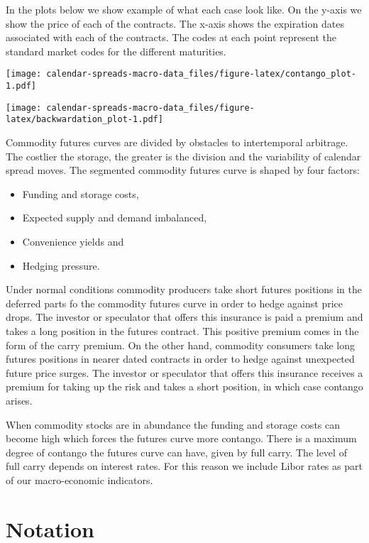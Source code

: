 \documentclass[
]{book}
\providecommand{\tightlist}{%
  \setlength{\itemsep}{0pt}\setlength{\parskip}{0pt}}
\begin{document}
In the plots below we show example of what each case look like. On the y-axis we show the price of each of the contracts. The x-axis shows the expiration dates associated with each of the contracts. The codes at each point represent the standard market codes for the different maturities.

\texttt{[image: calendar-spreads-macro-data\_files/figure-latex/contango\_plot-1.pdf]}

\texttt{[image: calendar-spreads-macro-data\_files/figure-latex/backwardation\_plot-1.pdf]}

Commodity futures curves are divided by obstacles to intertemporal arbitrage. The costlier the storage, the greater is the division and the variability of calendar spread moves. The segmented commodity futures curve is shaped by four factors:

\begin{itemize}
\tightlist
\item
  Funding and storage costs,
\item
  Expected supply and demand imbalanced,
\item
  Convenience yields and
\item
  Hedging pressure.
\end{itemize}

Under normal conditions commodity producers take short futures positions in the deferred parts fo the commodity futures curve in order to hedge against price drops. The investor or speculator that offers this insurance is paid a premium and takes a long position in the futures contract. This positive premium comes in the form of the carry premium. On the other hand, commodity consumers take long futures positions in nearer dated contracts in order to hedge against unexpected future price surges. The investor or speculator that offers this insurance receives a premium for taking up the risk and takes a short position, in which case contango arises.

When commodity stocks are in abundance the funding and storage costs can become high which forces the futures curve more contango. There is a maximum degree of contango the futures curve can have, given by full carry. The level of full carry depends on interest rates. For this reason we include Libor rates as part of our macro-economic indicators.

\hypertarget{notation}{%
\section{Notation}\label{notation}}
\end{document}
